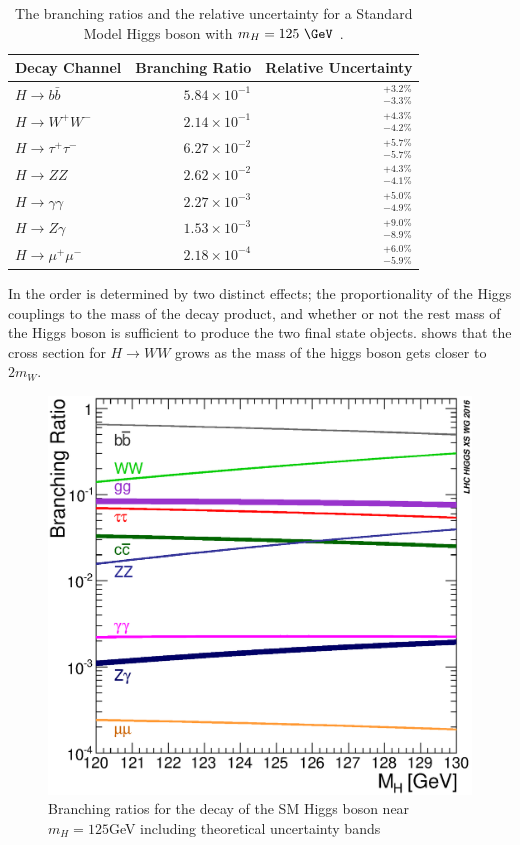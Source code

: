 \begin{table}[htpb]
 \centering
 \caption{ The branching ratios and the relative uncertainty for a Standard Model Higgs boson with $m_{H}=125~\GeV$ \cite{PDG2018:Ch11}.}
 \begin{tabular}{@{}lrr@{}} \toprule
  Decay Channel           & Branching Ratio       & Relative Uncertainty \\ \midrule
  $H\to b\bar{b}$         & $5.84 \times 10^{-1}$ & $_{-3.3\%}^{+3.2\%}$ \\
  \addlinespace[0.3em]
  $H\to W^{+}W^{-}$       & $2.14 \times 10^{-1}$ & $_{-4.2\%}^{+4.3\%}$ \\
  \addlinespace[0.3em]
  $H\to \tau^{+}\tau^{-}$ & $6.27 \times 10^{-2}$ & $_{-5.7\%}^{+5.7\%}$ \\
  \addlinespace[0.3em]
  $H\to ZZ$               & $2.62 \times 10^{-2}$ & $_{-4.1\%}^{+4.3\%}$ \\
  \addlinespace[0.3em]
  $H\to \gamma\gamma$     & $2.27 \times 10^{-3}$ & $_{-4.9\%}^{+5.0\%}$ \\
  \addlinespace[0.3em]
  $H\to Z\gamma$          & $1.53 \times 10^{-3}$ & $_{-8.9\%}^{+9.0\%}$ \\
  \addlinespace[0.3em]
  $H\to \mu^{+}\mu^{-}$   & $2.18 \times 10^{-4}$ & $_{-5.9\%}^{+6.0\%}$ \\
  \bottomrule
 \end{tabular}\label{table:higgs_branching_ratios}
\end{table} 

In  the order is determined by two distinct
effects; the proportionality of the Higgs couplings to the mass of the decay
product, and whether or not the rest mass of the Higgs boson is sufficient to
produce the two final state objects.   shows that
the cross section for $H \rightarrow WW$ grows as the mass of the higgs boson
gets closer to $2m_W$.

\begin{figure}[!htbp]
  \begin{center}
    \includegraphics[width=0.5\linewidth]{figures/higgs/higgs_decay_plot.eps}
    \caption{Branching ratios for the decay of the SM Higgs boson near $m_{H} = 125$GeV including theoretical uncertainty bands \cite{PDG2018:Ch11}}
    \label{fig:higgs_decay_plot}
  \end{center}
\end{figure}



